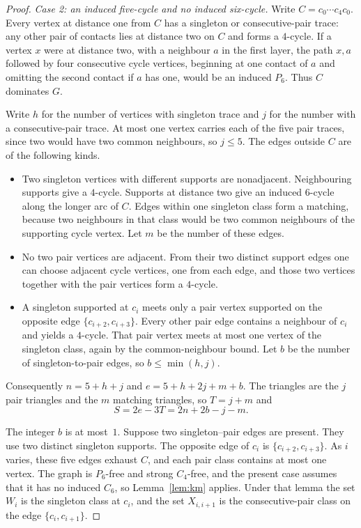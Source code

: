 \documentclass[ASNA]{USG}
\theoremstyle{WBstyletwo}
\numberwithin{equation}{section}
\begin{document}
\begin{proof}
\emph{Case 2: an induced five-cycle and no induced six-cycle.}
Write $C=c_0\cdots c_4c_0$. Every vertex at distance one from $C$ has a singleton or consecutive-pair trace: any other pair of contacts lies at distance two on $C$ and forms a $4$-cycle. If a vertex $x$ were at distance two, with a neighbour $a$ in the first layer, the path $x,a$ followed by four consecutive cycle vertices, beginning at one contact of $a$ and omitting the second contact if $a$ has one, would be an induced $P_6$. Thus $C$ dominates $G$.

Write $h$ for the number of vertices with singleton trace and $j$ for the number with a consecutive-pair trace. At most one vertex carries each of the five pair traces, since two would have two common neighbours, so $j\le 5$. The edges outside $C$ are of the following kinds.
\begin{itemize}
\item Two singleton vertices with different supports are nonadjacent. Neighbouring supports give a $4$-cycle. Supports at distance two give an induced $6$-cycle along the longer arc of $C$. Edges within one singleton class form a matching, because two neighbours in that class would be two common neighbours of the supporting cycle vertex. Let $m$ be the number of these edges.
\item No two pair vertices are adjacent. From their two distinct support edges one can choose adjacent cycle vertices, one from each edge, and those two vertices together with the pair vertices form a $4$-cycle.
\item A singleton supported at $c_i$ meets only a pair vertex supported on the opposite edge $\{c_{i+2},c_{i+3}\}$. Every other pair edge contains a neighbour of $c_i$ and yields a $4$-cycle. That pair vertex meets at most one vertex of the singleton class, again by the common-neighbour bound. Let $b$ be the number of singleton-to-pair edges, so $b\le\min(h,j)$.
\end{itemize}
Consequently $n=5+h+j$ and $e=5+h+2j+m+b$. The triangles are the $j$ pair triangles and the $m$ matching triangles, so $T=j+m$ and
\[
S=2e-3T=2n+2b-j-m.
\]

The integer $b$ is at most~$1$. Suppose two singleton--pair edges are present. They use two distinct singleton supports. The opposite edge of $c_i$ is $\{c_{i+2},c_{i+3}\}$. As $i$ varies, these five edges exhaust $C$, and each pair class contains at most one vertex. The graph is $P_6$-free and strong $C_4$-free, and the present case assumes that it has no induced $C_6$, so Lemma~\ref{lem:km} applies. Under that lemma the set $W_i$ is the singleton class at $c_i$, and the set $X_{i,i+1}$ is the consecutive-pair class on the edge $\{c_i,c_{i+1}\}$.


\end{proof}
\end{document}
